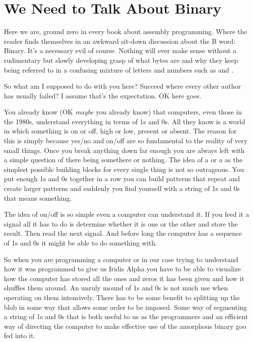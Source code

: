 \chapter{We Need to Talk About Binary} 
\lstset{style=6502Style}

Here we are, ground zero in every book about assembly programming. Where the reader
finds themselves in an awkward sit-down discussion about the B word: Binary. It's a necessary evil
of course. Nothing will ever make sense without a rudimentary but slowly developing
grasp of what bytes are and why they keep being referred to in a confusing mixture
of letters and numbers such as  and .

So what am I supposed to do with you here? Succeed where every other author has
usually failed? I assume that's the expectation. OK here goes.

You already know (OK \textit{maybe} you already know) that computers, even those in the 
1980s, understand everything in terms of 1s and 0s. All they know is a world
in which something is on or off, high or low, present or absent. The reason
for this is simply because yes/no and on/off are so fundamental to the reality
of very small things. Once you break anything down far enough you are always
left with a simple question of there being somethere or nothing. The idea of a
 or a  as the simplest possible building blocks for every
single thing is not so outrageous. You put enough 1s and 0s together in a row
you can build patterns that repeat and create larger patterns and suddenly
you find yourself with a string of 1s and 0s that means something.

The idea of on/off is so simple even a computer can understand it. If you feed
it a signal all it has to do is determine whether it is one or the other and
store the result. Then read the next signal. And before long the computer
has a sequence of 1s and 0s it might be able to do something with.

So when you are programming a computer or in our case trying to understand
how it was programmed to give us Iridis Alpha you have to be able to visualize
how the computer has stored all the ones and zeros it has been given and how
it shuffles them around. An unruly mound of 1s and 0s is not much use when
operating on them intensively. There has to be some benefit to splitting
up the blob in some way that allows some order to be imposed. Some way
of segmenting a string of 1s and 0s that is both useful to us as the
programmers and an efficient way of directing the computer to make effective
use of the amorphous binary goo fed into it.

